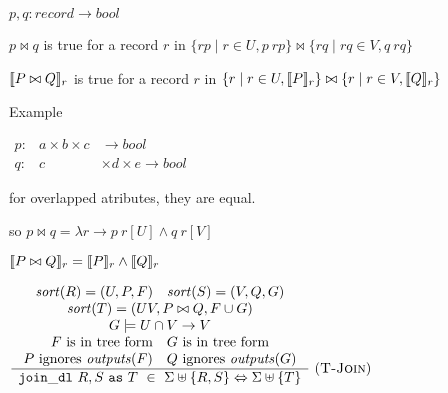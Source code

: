 \documentclass[12pt]{article}
\begin{document}
  $p,q : record \to bool$

  $p \bowtie q$ is true for a record $r$ in 
         $\{rp \mid r \in U,p\ rp\} \bowtie \{rq \mid rq \in V, q\ rq\}$

  $\llbracket P \bowtie Q\rrbracket_r$ is true for a record $r$ in 
         $\{r \mid r \in U,\llbracket P\rrbracket_r\} \bowtie \{r \mid r \in V, \llbracket Q\rrbracket_r\}$

  Example

  $\begin{array}{lrr}
     p: &a\times b\times c&                \to bool  \\
     q: &                c&\times d\times e\to bool
    \end{array}$

   for overlapped atributes, they are equal.

   so  $p \bowtie q = \lambda r \to p\ r[U] \wedge q\ r[V]$

       $\llbracket P \bowtie Q\rrbracket_r = \llbracket P\rrbracket_r \wedge \llbracket Q\rrbracket_r$

 
\ocweol
\ocwindent{0.00em}
$\frac{
\begin{array}{c}
  \mi{sort}(R) = (U,P,F) \quad \mi{sort}(S) = (V,Q,G) \\
  \mi{sort}(T) = (UV,P\bowtie Q,F \cup G) \\
  G \models U \cap V \to V \\
 F\ \text{is in tree form} \quad G\ \text{is in tree form}  \\
  P\ \text{ignores}\ \mi{outputs}(F) \quad Q\ \text{ignores}\ \mi{outputs}(G)
\end{array}}
{
\begin{array}{c}
\mt{join\_dl}\ R,S\ \mt{as}\ T\ \in\ \Sigma \uplus \{R,S\} \Leftrightarrow \Sigma \uplus \{T\}
\end{array}
}\ \text{(\textsc{T-Join})}
$
\end{document}
